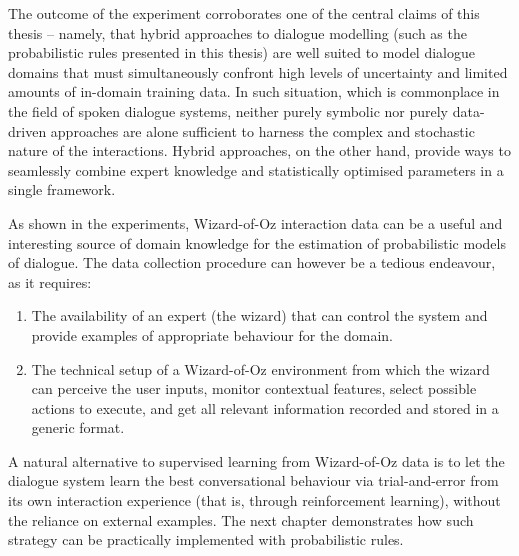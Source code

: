The outcome of the experiment corroborates one of the central claims of this thesis -- namely, that hybrid approaches to dialogue modelling (such as the probabilistic rules presented in this thesis) are well suited to model dialogue domains that must simultaneously confront high levels of uncertainty and limited amounts of in-domain training data.  In such situation, which is commonplace in the field of spoken dialogue systems, neither purely symbolic nor purely data-driven approaches are alone sufficient to harness the complex and stochastic nature of the interactions.  Hybrid approaches, on the other hand, provide ways to seamlessly combine expert knowledge and statistically optimised parameters in a single framework. 

As shown in the experiments, Wizard-of-Oz interaction data can be a useful and interesting source of domain knowledge for the estimation of probabilistic models of dialogue. The data collection procedure can however be a tedious endeavour, as it requires:
\begin{enumerate}
\item The availability of an expert (the wizard) that can control the system and provide examples of appropriate behaviour for the domain.
\item The technical setup of a Wizard-of-Oz environment from which the wizard can perceive the user inputs, monitor contextual features, select possible actions to execute, and get all relevant information recorded and stored in a generic format. 
\end{enumerate}

A natural alternative to supervised learning from Wizard-of-Oz data is to let the dialogue system learn the best conversational behaviour via trial-and-error from its own interaction experience (that is, through reinforcement learning), without the reliance on external examples.  The next chapter demonstrates how such strategy can be practically implemented with probabilistic rules. 
